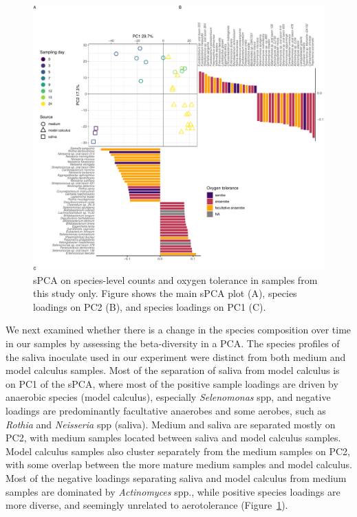 \documentclass[
]{article}
\begin{document}
\begin{figure}

{\centering \includegraphics{index_files/figure-pdf/fig-spca-byoc-1.pdf}

}

\caption{\label{fig-spca-byoc}sPCA on species-level counts and oxygen
tolerance in samples from this study only. Figure shows the main sPCA
plot (A), species loadings on PC2 (B), and species loadings on PC1 (C).}

\end{figure}

We next examined whether there is a change in the species composition
over time in our samples by assessing the beta-diversity in a PCA. The
species profiles of the saliva inoculate used in our experiment were
distinct from both medium and model calculus samples. Most of the
separation of saliva from model calculus is on PC1 of the sPCA, where
most of the positive sample loadings are driven by anaerobic species
(model calculus), especially \emph{Selenomonas} spp, and negative
loadings are predominantly facultative anaerobes and some aerobes, such
as \emph{Rothia} and \emph{Neisseria} spp (saliva). Medium and saliva
are separated mostly on PC2, with medium samples located between saliva
and model calculus samples. Model calculus samples also cluster
separately from the medium samples on PC2, with some overlap between the
more mature medium samples and model calculus. Most of the negative
loadings separating saliva and model calculus from medium samples are
dominated by \emph{Actinomyces} spp., while positive species loadings
are more diverse, and seemingly unrelated to aerotolerance
(Figure~\ref{fig-spca-byoc}).
\end{document}
